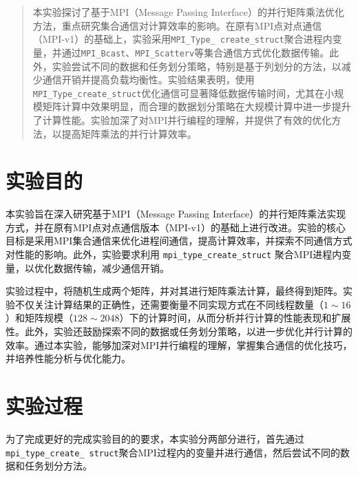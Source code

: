 \documentclass[a4paper, utf8]{ctexart}
\begin{document}
	\maketitle
	
	\renewcommand{\abstractname}{\large \textbf{摘要}}
	\begin{abstract}
		本实验探讨了基于MPI（Message Passing Interface）的并行矩阵乘法优化方法，重点研究集合通信对计算效率的影响。在原有MPI点对点通信（MPI-v1）的基础上，实验采用\verb|MPI_Type_|\ \verb|create_struct|聚合进程内变量，并通过\verb|MPI_Bcast|、\verb|MPI_Scatterv|等集合通信方式优化数据传输。此外，实验尝试不同的数据和任务划分策略，特别是基于列划分的方法，以减少通信开销并提高负载均衡性。实验结果表明，使用\verb|MPI_Type_create_struct|优化通信可显著降低数据传输时间，尤其在小规模矩阵计算中效果明显，而合理的数据划分策略在大规模计算中进一步提升了计算性能。实验加深了对MPI并行编程的理解，并提供了有效的优化方法，以提高矩阵乘法的并行计算效率。
		
	\end{abstract}
	
	\section{实验目的}
	
	本实验旨在深入研究基于MPI（Message Passing Interface）的并行矩阵乘法实现方式，并在原有MPI点对点通信版本（MPI-v1）的基础上进行改进。实验的核心目标是采用MPI集合通信来优化进程间通信，提高计算效率，并探索不同通信方式对性能的影响。此外，实验要求利用 \verb|mpi_type_create_struct| 聚合MPI进程内变量，以优化数据传输，减少通信开销。
	
	实验过程中，将随机生成两个矩阵，并对其进行矩阵乘法计算，最终得到矩阵。实验不仅关注计算结果的正确性，还需要衡量不同实现方式在不同线程数量（$1\sim16$）和矩阵规模（$128\sim2048$）下的计算时间，从而分析并行计算的性能表现和扩展性。此外，实验还鼓励探索不同的数据或任务划分策略，以进一步优化并行计算的效率。通过本实验，能够加深对MPI并行编程的理解，掌握集合通信的优化技巧，并培养性能分析与优化能力。
	
	\section{实验过程}
	
	为了完成更好的完成实验目的的要求，本实验分两部分进行，首先通过\verb|mpi_type_create_|\ \verb|struct|聚合MPI过程内的变量并进行通信，然后尝试不同的数据和任务划分方法。
	
\end{document}
